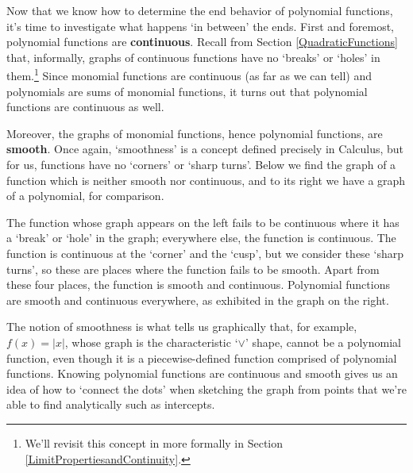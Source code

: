 \documentclass{ximera}
\begin{document}

Now that we know how to determine the end behavior of polynomial functions,  it's time to investigate what happens `in between' the ends.  First and foremost, polynomial functions are  \textbf{continuous}.  Recall from Section \ref{QuadraticFunctions} that, informally, graphs of continuous functions have no `breaks' or `holes' in them.\footnote{We'll revisit this concept in more formally in  Section \ref{LimitPropertiesandContinuity}.}   Since monomial functions are continuous (as far as we can tell) and polynomials are sums of monomial functions, it turns out that polynomial functions are continuous as well.  
 

Moreover, the graphs of monomial functions, hence polynomial functions, are  \textbf{smooth}.  Once again, `smoothness' is a concept defined precisely in Calculus, but for us,  functions have no `corners' or `sharp turns'.  Below we find the graph of a function which is neither smooth nor continuous, and to its right we have a graph of a polynomial, for comparison.  


The function whose graph appears on the left fails to be continuous where it has a `break' or `hole' in the graph;  everywhere else, the function is continuous.  The function is continuous at the `corner' and the `cusp', but we consider these `sharp turns', so these are places where the function fails to be smooth.  Apart from these four places, the function is smooth and continuous.  Polynomial functions are smooth and continuous everywhere, as exhibited in the graph on the right.  


The notion of smoothness is what tells us graphically that, for example, $f(x) = |x|$, whose graph is the characteristic `$\vee$' shape, cannot be a polynomial function, even though it is a piecewise-defined function comprised of polynomial functions.   Knowing polynomial functions are continuous and smooth gives us an idea of how to `connect the dots' when sketching the graph from points that we're able to find analytically such as intercepts.



\label{cusp picture}
\end{document}
